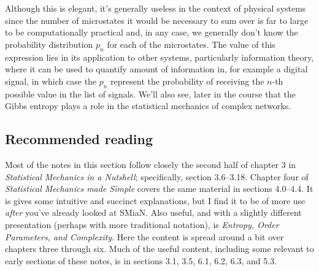 Although this is elegant, it's generally useless in the context of physical systems since the number of microstates it would be necessary to sum over is far to large to be computationally practical and, in any case, we generally don't know the probability distribution $p_n$ for each of the microstates. The value of this expression lies in its application to other systems, particularly information theory, where it can be used to quantify amount of information in, for example a digital signal, in which case the $p_n$ represent the probability of receiving the $n$-th possible value in the list of signals. We'll also see, later in the course that the Gibbs entropy plays a role in the statistical mechanics of complex networks.

\subsection{Recommended reading}
Most of the notes in this section follow closely the second half of chapter 3 in \emph{Statistical Mechanics in a Nutshell}; specifically, section 3.6--3.18. Chapter four of \emph{Statistical Mechanics made Simple} covers the same material in sections 4.0--4.4. It is gives some intuitive and succinct explanations, but I find it to be of more use \emph{after} you've already looked at SMiaN. Also useful, and with a slightly different presentation (perhaps with more traditional notation), is \emph{Entropy, Order Parameters, and Complexity}. Here the content is spread around a bit over chapters three through six. Much of the useful content, including some relevant to early sections of these notes, is in sections 3.1, 3.5, 6.1, 6.2, 6.3, and 5.3.
